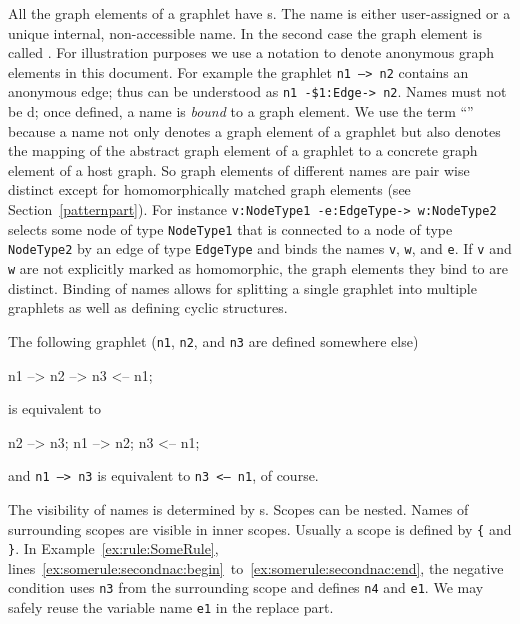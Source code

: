 All the graph elements of a graphlet have s.
The name is either user-assigned or a unique internal, non-accessible name.
In the second case the graph element is called .
For illustration purposes we use a  notation to denote anonymous graph elements in this document.
For example the graphlet \texttt{n1 --> n2} contains an anonymous edge; thus can be understood as \texttt{n1 -\$1:Edge-> n2}.
Names must not be d; once defined, a name is \emph{bound} to a graph element.
We use the term ``'' because a name not only denotes a graph element of a graphlet but also denotes the mapping of the abstract graph element of a graphlet to a concrete graph element of a host graph.
So graph elements of different names are pair wise distinct except for homomorphically matched graph elements (see Section~\ref{patternpart}).
For instance \texttt{v:NodeType1 -e:EdgeType-> w:NodeType2} selects some node of type \texttt{Node\-Type1} that is connected to a node of type \texttt{NodeType2} by an edge of type \texttt{EdgeType} and binds the names \texttt{v}, \texttt{w}, and \texttt{e}.
If \texttt{v} and \texttt{w} are not explicitly marked as homomorphic, the graph elements they bind to are distinct.
Binding of names allows for splitting a single graphlet into multiple graphlets as well as defining cyclic structures.
\begin{example}
The following graphlet (\texttt{n1}, \texttt{n2}, and \texttt{n3} are defined somewhere else)
\begin{grgen}
n1 --> n2 --> n3 <-- n1;
\end{grgen}
is equivalent to
\begin{grgen}
n2 --> n3;
n1 --> n2;
n3 <-- n1;
\end{grgen}
and \texttt{n1 --> n3} is equivalent to \texttt{n3 <-- n1}, of course.
\end{example}
The visibility of names is determined by s.
Scopes can be nested.
Names of surrounding scopes are visible in inner scopes.
Usually a scope is defined by \texttt{\{} and \texttt{\}}. %
In Example~\ref{ex:rule:SomeRule}, lines~\ref{ex:somerule:secondnac:begin}~to~\ref{ex:somerule:secondnac:end}, the negative condition uses \texttt{n3} from the surrounding scope and defines \texttt{n4} and \texttt{e1}.
We may safely reuse the variable name \texttt{e1} in the replace part.

